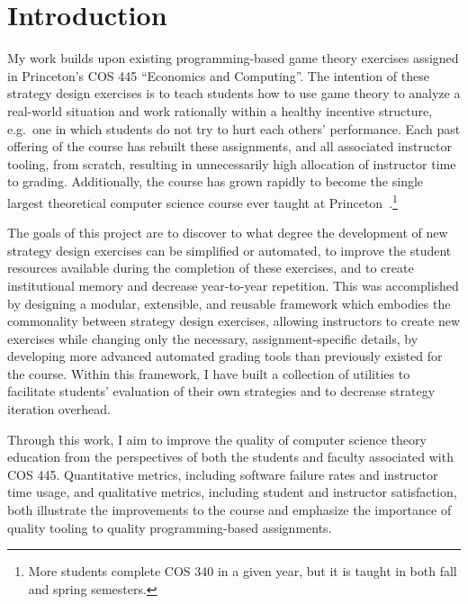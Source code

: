 \documentclass[pageno]{jpaper}
\begin{document}
\section*{Introduction}
My work builds upon existing programming-based game theory exercises assigned in Princeton's COS 445 ``Economics and Computing''.
The intention of these strategy design exercises is to teach students how to use game theory to analyze a real-world situation and work rationally within a healthy incentive structure, e.g.\ one in which students do not try to hurt each others’ performance.
Each past offering of the course has rebuilt these assignments, and all associated instructor tooling, from scratch, resulting in unnecessarily high allocation of instructor time to grading.
Additionally, the course has grown rapidly to become the single largest theoretical computer science course ever taught at Princeton~\cite{coursesizes}.\footnote{More students complete COS 340 in a given year, but it is taught in both fall and spring semesters.}

The goals of this project are to discover to what degree the development of new strategy design exercises can be simplified or automated, to improve the student resources available during the completion of these exercises, and to create institutional memory and decrease year-to-year repetition.
This was accomplished by designing a modular, extensible, and reusable framework which embodies the commonality between strategy design exercises, allowing instructors to create new exercises while changing only the necessary, assignment-specific details, by developing more advanced automated grading tools than previously existed for the course.
Within this framework, I have built a collection of utilities to facilitate students' evaluation of their own strategies and to decrease strategy iteration overhead.

Through this work, I aim to improve the quality of computer science theory education from the perspectives of both the students and faculty associated with COS 445.
Quantitative metrics, including software failure rates and instructor time usage, and qualitative metrics, including student and instructor satisfaction, both illustrate the improvements to the course and emphasize the importance of quality tooling to quality programming-based assignments.
\end{document}
